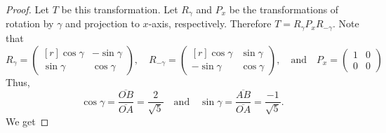 \begin{proof}
  Let $T$ be this transformation. Let $R_{\gamma}$ and $P_x$ be the
  transformations of rotation by $\gamma$ and projection to $x$-axis,
  respectively. Therefore $T=R_{\gamma}P_xR_{-\gamma}$. Note that
  \[
    R_{\gamma}=
    \begin{pmatrix*}[r]
      \cos\gamma &-\sin\gamma\\
      \sin\gamma &\cos\gamma
    \end{pmatrix*},
    \quad
    R_{-\gamma}=
    \begin{pmatrix*}[r]
      \cos\gamma &\sin\gamma\\
      -\sin\gamma &\cos\gamma
    \end{pmatrix*},
    \quad\text{and}\quad
    P_x=
    \begin{pmatrix}
      1  &0\\
      0  &0
    \end{pmatrix}
  \]
  Thus, 
  \[
    \cos\gamma=\frac{\overline{OB}}{\overline{OA}}=\frac{2}{\sqrt{5}}
    \quad\text{and}\quad
    \sin\gamma=\frac{\overline{AB}}{\overline{OA}}=\frac{-1}{\sqrt{5}}.
  \]
  We get
\end{proof}
